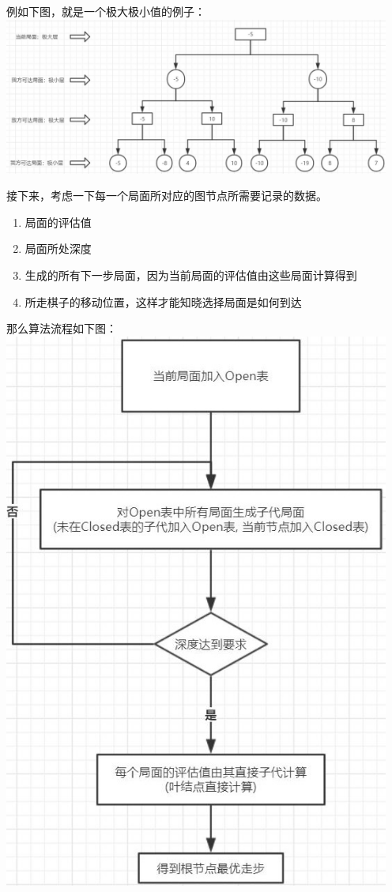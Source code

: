 例如下图，就是一个极大极小值的例子：\\
\includegraphics[width=5in]{minmax.jpg}

接下来，考虑一下每一个局面所对应的图节点所需要记录的数据。
\begin{enumerate}
    \item 局面的评估值
    \item 局面所处深度
    \item 生成的所有下一步局面，因为当前局面的评估值由这些局面计算得到
    \item 所走棋子的移动位置，这样才能知晓选择局面是如何到达
\end{enumerate}

那么算法流程如下图：\\
\includegraphics[width=5in]{minmaxAlgorithm.jpg}

